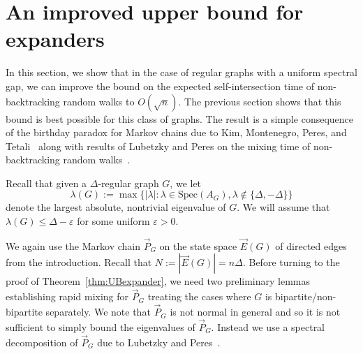 \documentclass[11pt,a4paper]{article}
\theoremstyle{plain}
\let\eps=\varepsilon
\begin{document}
\section{An improved upper bound for expanders}

In this section, we show that in the case of regular graphs with a uniform spectral gap, we can improve the bound on the expected self-intersection time of non-backtracking random walks to $O(\sqrt{n})$. The previous section shows that this bound is best possible for this class of graphs. The result is a simple consequence of the birthday paradox for Markov chains due to Kim, Montenegro, Peres, and Tetali~\cite[Theorem 3.6]{kim2008birthday} along with results of Lubetzky and Peres on the mixing time of non-backtracking random walks~\cite{LubetzkyPeres}.

Recall that given a $\Delta$-regular graph $G$, we let
\[
\lambda(G):=\max \{|\lambda|: \lambda\in \textrm{Spec}(A_G), \lambda\notin\{\Delta, -\Delta\}\}
\]
denote the largest absolute, nontrivial eigenvalue of $G$. We will assume that $\lambda(G) \leq \Delta-\eps$ for some uniform $\eps>0$.

We again use the Markov chain $\vec P_G$ on the state space $\vec E(G)$ of directed edges from the introduction. Recall that $N:=|\vec E(G)|=n\Delta$.
Before turning to the proof of Theorem~\ref{thm:UBexpander}, we need two preliminary lemmas establishing rapid mixing for $\vec P_G$ treating the cases where $G$ is bipartite/non-bipartite separately. We note that \(\vec P_G\) is not normal in general and so it is not sufficient to simply bound the eigenvalues of \(\vec P_G\). Instead we use a spectral decomposition of  $\vec P_G$ due to Lubetzky and Peres~\cite{LubetzkyPeres}.
\end{document}
